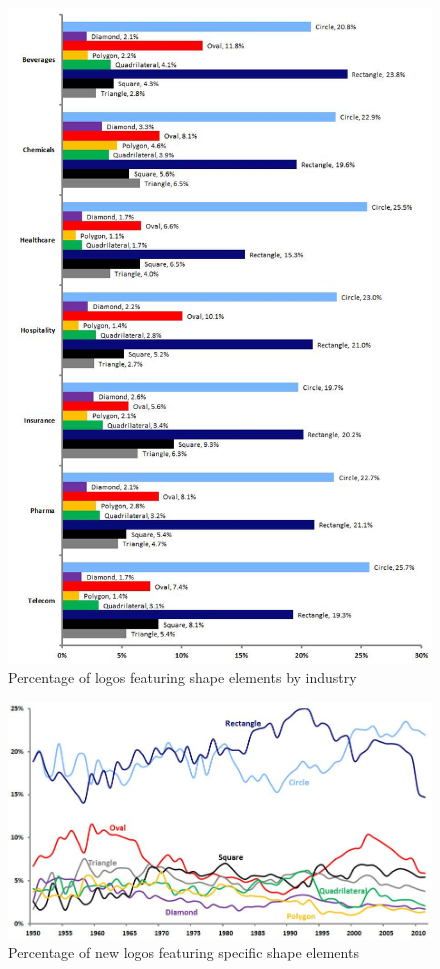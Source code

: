 \begin{figure}[ht]
  \centering
  \includegraphics[width=.5\linewidth]{images/supplement/emblemetrics/shapeindustry}
  \caption[]{Percentage of logos featuring shape elements by industry}
  \label{fig:emblemetrics:shape-industry}
\end{figure}

\begin{figure}[ht]
  \centering
  \includegraphics[width=.5\linewidth]{images/supplement/emblemetrics/shape}
  \caption[]{Percentage of new logos featuring specific shape elements}
  \label{fig:emblemetrics:shape}
\end{figure}
